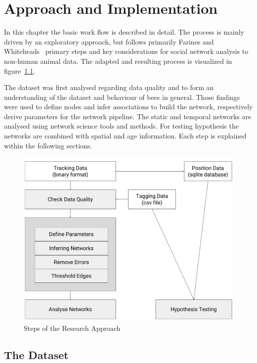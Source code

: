 \chapter{Approach and Implementation}
\label{ch:approach}
In this chapter the basic work flow is described in detail. The process is mainly driven by an exploratory approach, but follows primarily Farines and Whiteheads~\cite{farine2015constructing} primary steps and key considerations for social network analysis to non-human animal data. The adapted and resulting process is visualized in figure~\ref{fig:process}.

The dataset was first analysed regarding data quality and to form an understanding of the dataset and behaviour of bees in general. Those findings were used to define nodes and infer associations to build the network, respectively derive parameters for the network pipeline. The static and temporal networks are analysed using network science tools and methods. For testing hypothesis the networks are combined with spatial and age information. Each step is explained within the following sections.

\begin{figure}[htb]
	\centering
	\includegraphics[width=1.0\textwidth]{Figures/process}
	\caption{Steps of the Research Approach}
	\label{fig:process}
\end{figure}


\section{The Dataset}
\label{sec:dataset}

